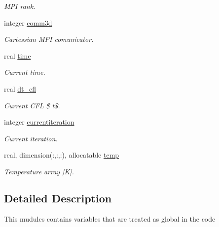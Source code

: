 \begin{DoxyCompactItemize}
\begin{DoxyCompactList}\small\item\em M\+P\+I rank. \end{DoxyCompactList}\item 
\hypertarget{namespaceglobals_a4bc8f1b5670efd802d57dce2c385b6d9}{}integer \hyperlink{namespaceglobals_a4bc8f1b5670efd802d57dce2c385b6d9}{comm3d}\label{namespaceglobals_a4bc8f1b5670efd802d57dce2c385b6d9}

\begin{DoxyCompactList}\small\item\em Cartessian M\+P\+I comunicator. \end{DoxyCompactList}\item 
\hypertarget{namespaceglobals_acc5c9a03b08561f9eeb530eb65221dbb}{}real \hyperlink{namespaceglobals_acc5c9a03b08561f9eeb530eb65221dbb}{time}\label{namespaceglobals_acc5c9a03b08561f9eeb530eb65221dbb}

\begin{DoxyCompactList}\small\item\em Current time. \end{DoxyCompactList}\item 
\hypertarget{namespaceglobals_a1599fd11dcd5dfa9104003de3a2d03e5}{}real \hyperlink{namespaceglobals_a1599fd11dcd5dfa9104003de3a2d03e5}{dt\+\_\+cfl}\label{namespaceglobals_a1599fd11dcd5dfa9104003de3a2d03e5}

\begin{DoxyCompactList}\small\item\em Current C\+F\+L \$ t\$. \end{DoxyCompactList}\item 
\hypertarget{namespaceglobals_a6966cf52ad4f442a7fe69efa6d5c0bee}{}integer \hyperlink{namespaceglobals_a6966cf52ad4f442a7fe69efa6d5c0bee}{currentiteration}\label{namespaceglobals_a6966cf52ad4f442a7fe69efa6d5c0bee}

\begin{DoxyCompactList}\small\item\em Current iteration. \end{DoxyCompactList}\item 
\hypertarget{namespaceglobals_a6942102ba8bd15a3350901de0b99bafa}{}real, dimension(\+:,\+:,\+:), allocatable \hyperlink{namespaceglobals_a6942102ba8bd15a3350901de0b99bafa}{temp}\label{namespaceglobals_a6942102ba8bd15a3350901de0b99bafa}

\begin{DoxyCompactList}\small\item\em Temperature array \mbox{[}K\mbox{]}. \end{DoxyCompactList}\end{DoxyCompactItemize}


\subsection{Detailed Description}
This mudules contains variables that are treated as global in the code 